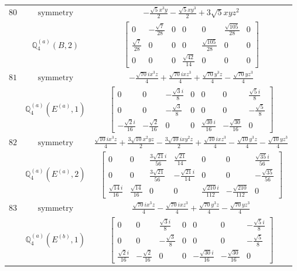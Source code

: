 \documentclass[fleqn,8pt,landscape]{jsarticle}
\begin{document}
\begin{longtable}{ccc}
$ 80 $ & $ \text{symmetry} $ & $ - \frac{\sqrt{5} x^{3} y}{2} - \frac{\sqrt{5} x y^{3}}{2} + 3 \sqrt{5} x y z^{2} $ \\
$  $ & $ \mathbb{Q}_{4}^{(a)}(B,2) $ & $ \begin{bmatrix} 0 & - \frac{\sqrt{7}}{28} & 0 & 0 & 0 & \frac{\sqrt{105}}{28} & 0 \\ \frac{\sqrt{7}}{28} & 0 & 0 & 0 & \frac{\sqrt{105}}{28} & 0 & 0 \\ 0 & 0 & 0 & \frac{\sqrt{42}}{14} & 0 & 0 & 0 \end{bmatrix} $ \\ \hline
$ 81 $ & $ \text{symmetry} $ & $ - \frac{\sqrt{70} i x^{3} z}{4} + \frac{\sqrt{70} i x z^{3}}{4} + \frac{\sqrt{70} y^{3} z}{4} - \frac{\sqrt{70} y z^{3}}{4} $ \\
$  $ & $ \mathbb{Q}_{4}^{(a)}(E^{(a)},1) $ & $ \begin{bmatrix} 0 & 0 & - \frac{\sqrt{3} i}{8} & 0 & 0 & 0 & \frac{\sqrt{5} i}{8} \\ 0 & 0 & - \frac{\sqrt{3}}{8} & 0 & 0 & 0 & - \frac{\sqrt{5}}{8} \\ - \frac{\sqrt{2} i}{16} & - \frac{\sqrt{2}}{16} & 0 & 0 & \frac{\sqrt{30} i}{16} & - \frac{\sqrt{30}}{16} & 0 \end{bmatrix} $ \\ \hline
$ 82 $ & $ \text{symmetry} $ & $ \frac{\sqrt{10} i x^{3} z}{4} + \frac{3 \sqrt{10} x^{2} y z}{2} - \frac{3 \sqrt{10} i x y^{2} z}{2} + \frac{\sqrt{10} i x z^{3}}{4} - \frac{\sqrt{10} y^{3} z}{4} - \frac{\sqrt{10} y z^{3}}{4} $ \\
$  $ & $ \mathbb{Q}_{4}^{(a)}(E^{(a)},2) $ & $ \begin{bmatrix} 0 & 0 & \frac{3 \sqrt{21} i}{56} & \frac{\sqrt{21}}{14} & 0 & 0 & \frac{\sqrt{35} i}{56} \\ 0 & 0 & \frac{3 \sqrt{21}}{56} & - \frac{\sqrt{21} i}{14} & 0 & 0 & - \frac{\sqrt{35}}{56} \\ \frac{\sqrt{14} i}{16} & \frac{\sqrt{14}}{16} & 0 & 0 & \frac{\sqrt{210} i}{112} & - \frac{\sqrt{210}}{112} & 0 \end{bmatrix} $ \\ \hline
$ 83 $ & $ \text{symmetry} $ & $ \frac{\sqrt{70} i x^{3} z}{4} - \frac{\sqrt{70} i x z^{3}}{4} + \frac{\sqrt{70} y^{3} z}{4} - \frac{\sqrt{70} y z^{3}}{4} $ \\
$  $ & $ \mathbb{Q}_{4}^{(a)}(E^{(b)},1) $ & $ \begin{bmatrix} 0 & 0 & \frac{\sqrt{3} i}{8} & 0 & 0 & 0 & - \frac{\sqrt{5} i}{8} \\ 0 & 0 & - \frac{\sqrt{3}}{8} & 0 & 0 & 0 & - \frac{\sqrt{5}}{8} \\ \frac{\sqrt{2} i}{16} & - \frac{\sqrt{2}}{16} & 0 & 0 & - \frac{\sqrt{30} i}{16} & - \frac{\sqrt{30}}{16} & 0 \end{bmatrix} $ \\ \hline

\end{longtable}
\end{document}
